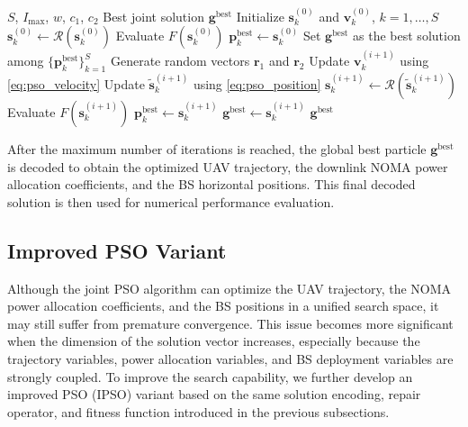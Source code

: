 \documentclass[conference]{IEEEtran}
\begin{document}
\begin{algorithm}[!t] 
\caption{Joint PSO-Based Optimization Algorithm} 
\label{alg:joint_pso} 
\footnotesize 
\begin{algorithmic}[1] 
\Require $S$, $I_{\max}$, $w$, $c_1$, $c_2$ 
\Ensure Best joint solution $\mathbf{g}^{\mathrm{best}}$ 
\State Initialize $\mathbf{s}_k^{(0)}$ and $\mathbf{v}_k^{(0)}$, $k=1,\ldots,S$ 
    \State $\mathbf{s}_k^{(0)} \leftarrow \mathcal{R}(\mathbf{s}_k^{(0)})$ \State Evaluate $F(\mathbf{s}_k^{(0)})$ 
    \State $\mathbf{p}_k^{\mathrm{best}} \leftarrow \mathbf{s}_k^{(0)}$ 
\EndFor 
\State Set $\mathbf{g}^{\mathrm{best}}$ as the best solution among $\{\mathbf{p}_k^{\mathrm{best}}\}_{k=1}^{S}$ 
        \State Generate random vectors $\mathbf{r}_1$ and $\mathbf{r}_2$ \State Update $\mathbf{v}_k^{(i+1)}$ using \eqref{eq:pso_velocity} \State Update $\tilde{\mathbf{s}}_k^{(i+1)}$ using \eqref{eq:pso_position} 
        \State $\mathbf{s}_k^{(i+1)} \leftarrow \mathcal{R}(\tilde{\mathbf{s}}_k^{(i+1)})$ 
        \State Evaluate $F(\mathbf{s}_k^{(i+1)})$ 
                    \State $\mathbf{p}_k^{\mathrm{best}} \leftarrow \mathbf{s}_k^{(i+1)}$ 
        \EndIf 
            \State $\mathbf{g}^{\mathrm{best}} \leftarrow \mathbf{s}_k^{(i+1)}$ 
        \EndIf 
    \EndFor 
\EndFor 
\State \Return $\mathbf{g}^{\mathrm{best}}$ 
\end{algorithmic} 
\end{algorithm} 
After the maximum number of iterations is reached, the global best particle $\mathbf{g}^{\mathrm{best}}$ is decoded to obtain the optimized UAV trajectory, the downlink NOMA power allocation coefficients, and the BS horizontal positions. This final decoded solution is then used for numerical performance evaluation.

\subsection{Improved PSO Variant}
\label{subsec:ipso_variant}

Although the joint PSO algorithm can optimize the UAV trajectory, the NOMA power allocation coefficients, and the BS positions in a unified search space, it may still suffer from premature convergence. This issue becomes more significant when the dimension of the solution vector increases, especially because the trajectory variables, power allocation variables, and BS deployment variables are strongly coupled. To improve the search capability, we further develop an improved PSO (IPSO) variant based on the same solution encoding, repair operator, and fitness function introduced in the previous subsections.
\end{document}
